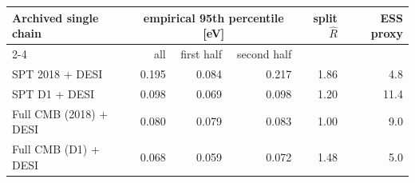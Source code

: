 \begin{tabular}{@{}l r r r r r@{}}
\toprule
Archived single chain & \multicolumn{3}{c}{empirical 95th percentile [eV]} & split $\hat R$ & ESS proxy \\
\cmidrule(lr){2-4}
 & all & first half & second half & & \\
\midrule
SPT 2018 + DESI & 0.195 & 0.084 & 0.217 & 1.86 & 4.8 \\
SPT D1 + DESI & 0.098 & 0.069 & 0.098 & 1.20 & 11.4 \\
Full CMB (2018) + DESI & 0.080 & 0.079 & 0.083 & 1.00 & 9.0 \\
Full CMB (D1) + DESI & 0.068 & 0.059 & 0.072 & 1.48 & 5.0 \\
\bottomrule
\end{tabular}
